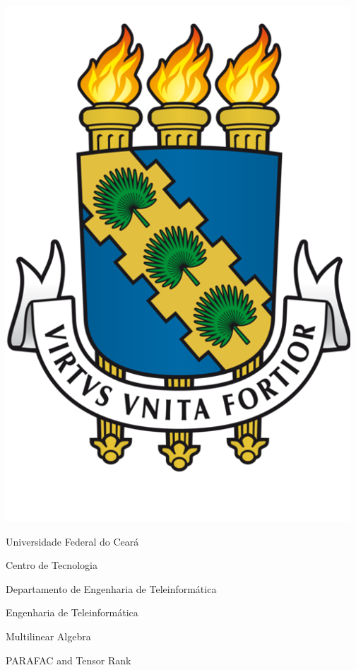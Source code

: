 \thispagestyle{empty}

\begin{center}
  
    \includegraphics[scale=0.10]{figs/icon.png}
    
    \LARGE{Universidade Federal do Ceará}
    
    \LARGE{Centro de Tecnologia}
    
    \LARGE{Departamento de Engenharia de Teleinformática}
    
    \LARGE{Engenharia de Teleinformática}
    
    \vspace{180pt}
      
    \LARGE{Multilinear Algebra}
      
    \LARGE{PARAFAC and Tensor Rank}
      
    \vspace{100pt}
    
\end{center}

